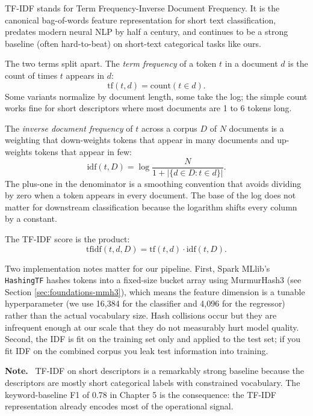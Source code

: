 \documentclass[11pt,letterpaper]{book}
\newenvironment{notebox}{\begin{framed}\textbf{Note.}~}{\end{framed}}
\begin{document}
TF-IDF stands for Term Frequency-Inverse Document Frequency. It is the canonical bag-of-words feature representation for short text classification, predates modern neural NLP by half a century, and continues to be a strong baseline (often hard-to-beat) on short-text categorical tasks like ours.

The two terms split apart. The \emph{term frequency} of a token $t$ in a document $d$ is the count of times $t$ appears in $d$:
\begin{equation}
\mathrm{tf}(t, d) = \mathrm{count}(t \in d).
\end{equation}
Some variants normalize by document length, some take the log; the simple count works fine for short descriptors where most documents are 1 to 6 tokens long.

The \emph{inverse document frequency} of $t$ across a corpus $D$ of $N$ documents is a weighting that down-weights tokens that appear in many documents and up-weights tokens that appear in few:
\begin{equation}
\mathrm{idf}(t, D) = \log \frac{N}{1 + |\{d \in D : t \in d\}|}.
\end{equation}
The plus-one in the denominator is a smoothing convention that avoids dividing by zero when a token appears in every document. The base of the log does not matter for downstream classification because the logarithm shifts every column by a constant.

The TF-IDF score is the product:
\begin{equation}
\mathrm{tfidf}(t, d, D) = \mathrm{tf}(t, d) \cdot \mathrm{idf}(t, D).
\end{equation}

Two implementation notes matter for our pipeline. First, Spark MLlib's \texttt{HashingTF} hashes tokens into a fixed-size bucket array using MurmurHash3 (see Section \ref{sec:foundations-mmh3}), which means the feature dimension is a tunable hyperparameter (we use 16,384 for the classifier and 4,096 for the regressor) rather than the actual vocabulary size. Hash collisions occur but they are infrequent enough at our scale that they do not measurably hurt model quality. Second, the IDF is fit on the training set only and applied to the test set; if you fit IDF on the combined corpus you leak test information into training.

\begin{notebox}
TF-IDF on short descriptors is a remarkably strong baseline because the descriptors are mostly short categorical labels with constrained vocabulary. The keyword-baseline F1 of 0.78 in Chapter 5 is the consequence: the TF-IDF representation already encodes most of the operational signal.
\end{notebox}
\end{document}
